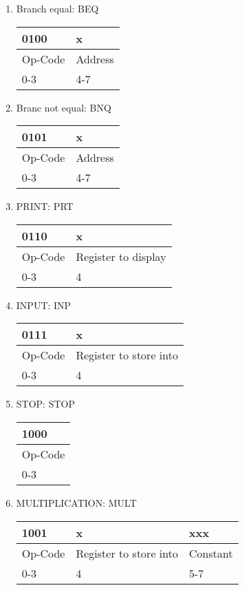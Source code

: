 \documentclass{article}
\begin{document}
\begin{enumerate}
\item Branch equal: BEQ\\
  \begin{tabularx}{\textwidth}{|X|X|}
    \hline 0100 & x
    \\ \hline Op-Code & Address
    \\ \hline 0-3 & 4-7
    \\ \hline
  \end{tabularx}
  
\item Branc not equal: BNQ\\
  \begin{tabularx}{\textwidth}{|X|X|}
    \hline 0101 & x
    \\ \hline Op-Code & Address
    \\ \hline 0-3 & 4-7
    \\ \hline
  \end{tabularx}

\item PRINT: PRT\\
  \begin{tabularx}{\textwidth}{|X|X|}
    \hline 0110 & x
    \\ \hline Op-Code & Register to display
    \\ \hline 0-3 & 4
    \\ \hline
  \end{tabularx}

\item INPUT: INP\\
  \begin{tabularx}{\textwidth}{|X|X|}
    \hline 0111 & x
    \\ \hline Op-Code & Register to store into
    \\ \hline 0-3 & 4
    \\ \hline
  \end{tabularx}

\item STOP: STOP\\
  \begin{tabularx}{\textwidth}{|X|}
    \hline 1000
    \\ \hline Op-Code
    \\ \hline 0-3
    \\ \hline
  \end{tabularx}

\item MULTIPLICATION: MULT\\
  \begin{tabularx}{\textwidth}{|X|X|X|}
    \hline 1001 & x & xxx
    \\ \hline Op-Code & Register to store into & Constant
    \\ \hline 0-3 & 4 & 5-7
    \\ \hline
  \end{tabularx}
  
\end{enumerate}
\end{document}
